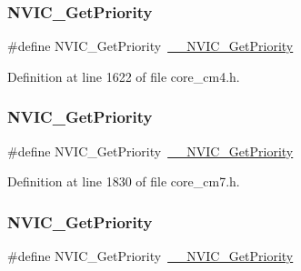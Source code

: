 \subsubsection{\texorpdfstring{N\+V\+I\+C\+\_\+\+Get\+Priority}{NVIC\_GetPriority}\hspace{0.1cm}{\footnotesize\ttfamily [9/13]}}
{\footnotesize\ttfamily \#define N\+V\+I\+C\+\_\+\+Get\+Priority~\hyperlink{group___c_m_s_i_s___core___n_v_i_c_functions_gaeb9dc99c8e7700668813144261b0bc73}{\+\_\+\+\_\+\+N\+V\+I\+C\+\_\+\+Get\+Priority}}



Definition at line 1622 of file core\+\_\+cm4.\+h.

\mbox{\label{group___c_m_s_i_s___core___n_v_i_c_functions_gaf59b9d0a791d2157abb319753953eceb}} 
\subsubsection{\texorpdfstring{N\+V\+I\+C\+\_\+\+Get\+Priority}{NVIC\_GetPriority}\hspace{0.1cm}{\footnotesize\ttfamily [10/13]}}
{\footnotesize\ttfamily \#define N\+V\+I\+C\+\_\+\+Get\+Priority~\hyperlink{group___c_m_s_i_s___core___n_v_i_c_functions_gaeb9dc99c8e7700668813144261b0bc73}{\+\_\+\+\_\+\+N\+V\+I\+C\+\_\+\+Get\+Priority}}



Definition at line 1830 of file core\+\_\+cm7.\+h.

\mbox{\label{group___c_m_s_i_s___core___n_v_i_c_functions_gaf59b9d0a791d2157abb319753953eceb}} 
\subsubsection{\texorpdfstring{N\+V\+I\+C\+\_\+\+Get\+Priority}{NVIC\_GetPriority}\hspace{0.1cm}{\footnotesize\ttfamily [11/13]}}
{\footnotesize\ttfamily \#define N\+V\+I\+C\+\_\+\+Get\+Priority~\hyperlink{group___c_m_s_i_s___core___n_v_i_c_functions_gaeb9dc99c8e7700668813144261b0bc73}{\+\_\+\+\_\+\+N\+V\+I\+C\+\_\+\+Get\+Priority}}



